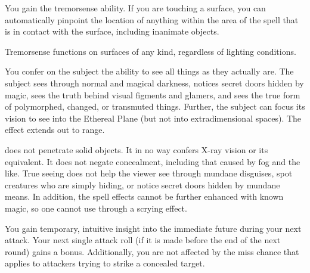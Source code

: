 \begin{spelleffect}
  You gain the tremorsense ability. If you are touching a surface, you can automatically pinpoint the location of anything within the area of the spell that is in contact with the surface, including inanimate objects.
\end{spelleffect}
\begin{spellnotes}
  Tremorsense functions on surfaces of any kind, regardless of lighting conditions.
\end{spellnotes}

\spelldur{\durshort}
\begin{spelleffect}
  You confer on the subject the ability to see all things as they actually are. The subject sees through normal and magical darkness, notices secret doors hidden by magic, sees the truth behind visual figments and glamers, and sees the true form of polymorphed, changed, or transmuted things. Further, the subject can focus its vision to see into the Ethereal Plane (but not into extradimensional spaces). The effect extends out to \rngmed range.
\end{spelleffect}
\begin{spellnotes}
   does not penetrate solid objects. It in no way confers X-ray vision or its equivalent. It does not negate concealment, including that caused by fog and the like. True seeing does not help the viewer see through mundane disguises, spot creatures who are simply hiding, or notice secret doors hidden by mundane means. In addition, the spell effects cannot be further enhanced with known magic, so one cannot use  through a scrying effect.
\end{spellnotes}

\begin{spelleffect}
  You gain temporary, intuitive insight into the immediate future during your next attack. Your next single attack roll (if it is made before the end of the next round) gains a  bonus. Additionally, you are not affected by the miss chance that applies to attackers trying to strike a concealed target.
\end{spelleffect}

